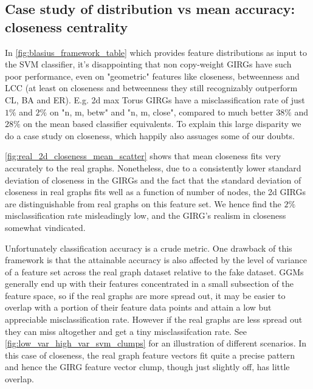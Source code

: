 \subsection{Case study of distribution vs mean accuracy: closeness centrality}
In \cref{fig:blasius_framework_table} which provides feature distributions as input to the SVM classifier, it's disappointing that non copy-weight GIRGs have such poor performance, even on "geometric" features like closeness, betweenness and LCC (at least on closeness and betweenness they still recognizably outperform CL, BA and ER). E.g. 2d max Torus GIRGs have a misclassification rate of just $1\%$ and $2\%$ on "n, m, betw" and "n, m, close", compared to much better $38\%$ and $28\%$ on the mean based classifier equivalents. To explain this large disparity we do a case study on closeness, which happily also assuages some of our doubts.

\cref{fig:real_2d_closeness_mean_scatter} shows that mean closeness fits very accurately to the real graphs. Nonetheless, due to a consistently lower standard deviation of closeness in the GIRGs and the fact that the standard deviation of closeness in real graphs fits well as a function of number of nodes, the 2d GIRGs are distinguishable from real graphs on this feature set. We hence find the $2\%$ misclassification rate misleadingly low, and the GIRG's realism in closeness somewhat vindicated.


Unfortunately classification accuracy is a crude metric. One drawback of this framework is that the attainable accuracy is also affected by the level of variance of a feature set across the real graph dataset relative to the fake dataset. GGMs generally end up with their features concentrated in a small subsection of the feature space, so if the real graphs are more spread out, it may be easier to overlap with a portion of their feature data points and attain a low but appreciable misclassification rate. However if the real graphs are less spread out they can miss altogether and get a tiny misclassifcation rate. See \cref{fig:low_var_high_var_svm_clumps} for an illustration of different scenarios. In this case of closeness, the real graph feature vectors fit quite a precise pattern and hence the GIRG feature vector clump, though just slightly off, has little overlap.

